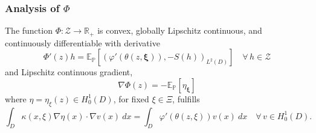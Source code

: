 \documentclass[aspectratio=169,xcolor=dvipsnames,11pt]{beamer}
\newcommand{\dd}{\:d}
\newcommand{\dif}{\dd}
\renewcommand{\Pr}{\mathbb{P}}
\newcommand{\setZ}{\mathcal{Z}}
\newcommand{\xibold}{\mathbold{\xi}}
\newcommand{\Ex}{\mathbb E}
\newcommand{\scrZ}{\mathcal{Z}}
\begin{document}
\begin{footnotesize}
\begin{frame}\frametitle{Analysis of $\Phi$}
\pause
\begin{theorem}\label{lem:psi_prop}
  The function $\Phi : \setZ \to \mathbb R_{+}$ is convex,
  globally Lipschitz continuous, and continuously differentiable with
  derivative
  \begin{equation}\label{eq:phi_deriv}
    \Phi'(z) h =\Ex_{\Pr}\left[\left(\varphi'( \theta(z,\xibold)), -S(h)\right)_{L^2(D)}\right]
    \quad\forall\, h\in\scrZ
  \end{equation}
  and Lipschitz continuous gradient,
  \begin{equation}\label{eq:phi_grad}
    \nabla \Phi(z) = -\Ex_{\Pr}[\eta_{\xibold}]
  \end{equation}
  where $\eta=\eta_\xi(z) \in H_0^1(D)$, for fixed $\xi\in\Xi$, fulfills
  \begin{equation}\label{eq:rpde_adj_g}
    \int_{D} \kappa(x,\xi)\nabla \eta(x) \cdot \nabla v(x) \dif x  = \int_{D} \varphi'(\theta(z,\xi))  v(x)  \dif x
      \quad\forall\,v\in H_0^1(D).
  \end{equation}
\end{theorem}

\end{frame}



\end{footnotesize}
\end{document}
